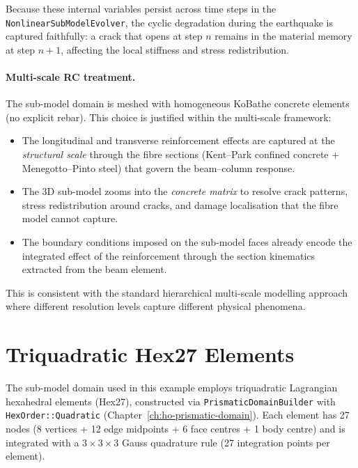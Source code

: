 Because these internal variables persist across time steps in the
\texttt{NonlinearSubModelEvolver}, the cyclic degradation during the
earthquake is captured faithfully: a crack that opens at step $n$
remains in the material memory at step $n{+}1$, affecting the local
stiffness and stress redistribution.

\paragraph{Multi-scale RC treatment.}
The sub-model domain is meshed with homogeneous KoBathe concrete
elements (no explicit rebar).  This choice is justified within the
multi-scale framework:
\begin{itemize}
  \item The longitudinal and transverse reinforcement effects are
        captured at the \emph{structural scale} through the fibre
        sections (Kent--Park confined concrete + Menegotto--Pinto
        steel) that govern the beam--column response.
  \item The 3D sub-model zooms into the \emph{concrete matrix} to
        resolve crack patterns, stress redistribution around cracks,
        and damage localisation that the fibre model cannot capture.
  \item The boundary conditions imposed on the sub-model faces
        already encode the integrated effect of the reinforcement
        through the section kinematics extracted from the beam element.
\end{itemize}
This is consistent with the standard hierarchical multi-scale modelling
approach where different resolution levels capture different physical
phenomena.


\section{Triquadratic Hex27 Elements}
\label{sec:nlevo-hex27}

The sub-model domain used in this example employs triquadratic
Lagrangian hexahedral elements (Hex27), constructed via
\texttt{PrismaticDomainBuilder} with \texttt{HexOrder::Quadratic}
(Chapter~\ref{ch:ho-prismatic-domain}).  Each element has 27 nodes
(8 vertices + 12 edge midpoints + 6 face centres + 1 body centre)
and is integrated with a $3 \times 3 \times 3$ Gauss quadrature rule
(27 integration points per element).

